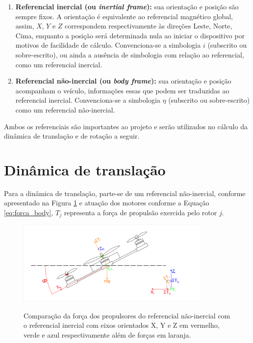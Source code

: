 \documentclass[main.tex]{subfiles}
\begin{document}
\begin{enumerate}
    \item \textbf{Referencial inercial (ou \textit{inertial frame}):} sua orientação e posição são sempre fixos. A orientação é equivalente ao referencial magnético global, assim, $X$, $Y$ e $Z$ correspondem respectivamente às direções Leste, Norte, Cima, enquanto a posição será determinada nula ao iniciar o dispositivo por motivos de facilidade de cálculo. Convenciona-se a simbologia $i$ (subscrito ou sobre-escrito), ou ainda a ausência de simbologia com relação ao referencial, como um referencial inercial.
    \item \textbf{Referencial não-inercial (ou \textit{body frame}):} sua orientação e posição acompanham o veículo, informações essas que podem ser traduzidas ao referencial inercial. Convenciona-se a simbologia $\eta$ (subscrito ou sobre-escrito) como um referencial não-inercial.
\end{enumerate}

Ambos os referenciais são importantes ao projeto e serão utilizados no cálculo da dinâmica de translação e de rotação a seguir.

\section{Dinâmica de translação}

Para a dinâmica de translação, parte-se de um referencial não-inercial, conforme apresentado na Figura \ref{fig:ref_frame} e atuação dos motores conforme a Equação \ref{eq:forca_body}, $T_j$ representa a força de propulsão exercida pelo rotor $j$.

\begin{figure}[!h]
    \centering
    \caption{Comparação da força dos propulsores do referencial não-inercial com o referencial inercial com eixos orientados X, Y e Z em vermelho, verde e azul respectivamente além de forças em laranja.}
    \includegraphics[width=0.85\textwidth]{capitulos/modelagem/imgs/ref_frame.png}
    \label{fig:ref_frame}
\end{figure}
\end{document}
